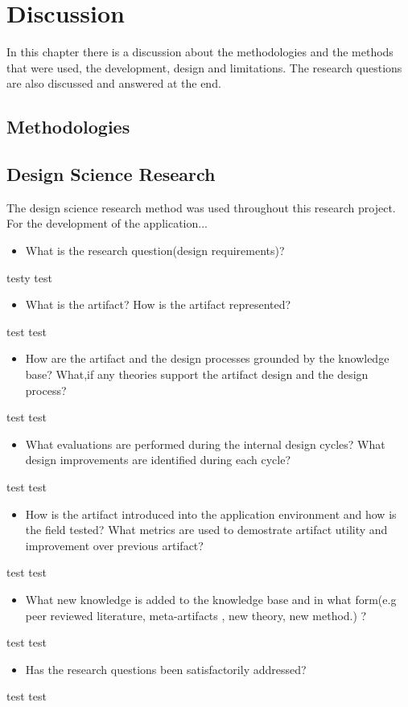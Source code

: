 \chapter{Discussion}
In this chapter there is a discussion about the methodologies and the methods that were used, the development, design and limitations. The research questions are also discussed and answered at the end. 
\section{Methodologies}

\section{Design Science Research}
The design science research method was used throughout this research project. For the development of the application...
\begin{itemize}
    \item What is the research question(design requirements)? 
\end{itemize}
 testy test
\begin{itemize}
    \item What is the artifact? How is the artifact represented?
\end{itemize}
test test 
\begin{itemize}
    \item How are the artifact and the design processes grounded by the knowledge base? What,if any theories support the artifact design and the design process?
\end{itemize}
test test 
\begin{itemize}
    \item What evaluations are performed during the internal design cycles? What design improvements are identified during each cycle?
\end{itemize}
test test 
\begin{itemize}
    \item How is the artifact introduced into the application environment and how is the field tested? What metrics are used to demostrate artifact utility and improvement over previous artifact?
\end{itemize}
test test 
\begin{itemize}
    \item What new knowledge is added to the knowledge base and in what form(e.g peer reviewed literature, meta-artifacts , new theory, new method.) ?
\end{itemize}
test test 
\begin{itemize}
    \item Has the research questions been satisfactorily addressed?
\end{itemize}
test test 


